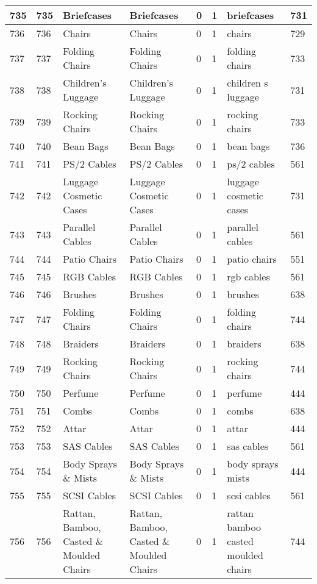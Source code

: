 \begin{longtable}{|l|l|l|l|l|l|l|l|}
735 & 735 & Briefcases & Briefcases & 0 & 1 & briefcases & 731 \\ \hline 
736 & 736 & Chairs & Chairs & 0 & 1 & chairs & 729 \\ \hline 
737 & 737 & Folding Chairs & Folding Chairs & 0 & 1 & folding chairs & 733 \\ \hline 
738 & 738 & Children's Luggage & Children's Luggage & 0 & 1 & children s luggage & 731 \\ \hline 
739 & 739 & Rocking Chairs & Rocking Chairs & 0 & 1 & rocking chairs & 733 \\ \hline 
740 & 740 & Bean Bags & Bean Bags & 0 & 1 & bean bags & 736 \\ \hline 
741 & 741 & PS/2 Cables & PS/2 Cables & 0 & 1 & ps/2 cables & 561 \\ \hline 
742 & 742 & Luggage Cosmetic Cases & Luggage Cosmetic Cases & 0 & 1 & luggage cosmetic cases & 731 \\ \hline 
743 & 743 & Parallel Cables & Parallel Cables & 0 & 1 & parallel cables & 561 \\ \hline 
744 & 744 & Patio Chairs & Patio Chairs & 0 & 1 & patio chairs & 551 \\ \hline 
745 & 745 & RGB Cables & RGB Cables & 0 & 1 & rgb cables & 561 \\ \hline 
746 & 746 & Brushes & Brushes & 0 & 1 & brushes & 638 \\ \hline 
747 & 747 & Folding Chairs & Folding Chairs & 0 & 1 & folding chairs & 744 \\ \hline 
748 & 748 & Braiders & Braiders & 0 & 1 & braiders & 638 \\ \hline 
749 & 749 & Rocking Chairs & Rocking Chairs & 0 & 1 & rocking chairs & 744 \\ \hline 
750 & 750 & Perfume & Perfume & 0 & 1 & perfume & 444 \\ \hline 
751 & 751 & Combs & Combs & 0 & 1 & combs & 638 \\ \hline 
752 & 752 & Attar & Attar & 0 & 1 & attar & 444 \\ \hline 
753 & 753 & SAS Cables & SAS Cables & 0 & 1 & sas cables & 561 \\ \hline 
754 & 754 & Body Sprays \& Mists & Body Sprays \& Mists & 0 & 1 & body sprays mists & 444 \\ \hline 
755 & 755 & SCSI Cables & SCSI Cables & 0 & 1 & scsi cables & 561 \\ \hline 
756 & 756 & Rattan, Bamboo, Casted \& Moulded Chairs & Rattan, Bamboo, Casted \& Moulded Chairs & 0 & 1 & rattan bamboo casted moulded chairs & 744 \\ \hline 

\end{longtable}
